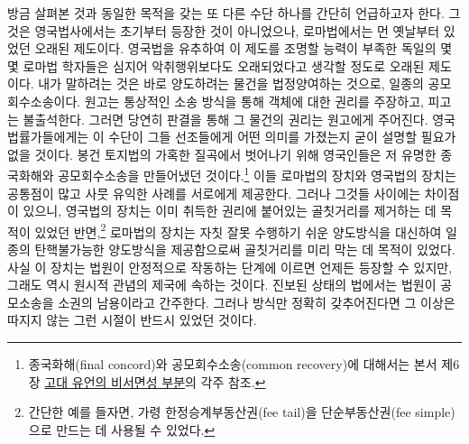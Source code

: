 방금 살펴본 것과 동일한 목적을 갖는 또 다른 수단 하나를
간단히 언급하고자 한다.
그것은 영국법사에서는 초기부터 등장한 것이 아니었으나,
로마법에서는 먼 옛날부터 있었던 오래된 제도이다.
영국법을 유추하여 이 제도를 조명할 능력이 부족한
독일의 몇몇 로마법 학자들은 심지어 악취행위보다도 오래되었다고
생각할 정도로 오래된 제도이다.
내가 말하려는 것은 바로
양도하려는 물건을
법정양여하는 것으로,
일종의 공모회수소송이다.
원고는 통상적인 소송 방식을 통해 객체에 대한 권리를 주장하고,
피고는 불출석한다. 그러면 당연히 판결을 통해 그 물건의 권리는
원고에게 주어진다.
영국 법률가들에게는
이 수단이 그들 선조들에게 어떤 의미를 가졌는지 굳이 설명할 필요가 없을 것이다.
봉건 토지법의 가혹한 질곡에서 벗어나기 위해
영국인들은
저 유명한
종국화해와 공모회수소송을 만들어냈던
것이다.\footnote{%
  종국화해(final concord)와 공모회수소송(common recovery)에 대해서는
  본서 제6장 \hyperlink{finerecovery}{고대 유언의 비서면성 부분}의 각주 참조.
  }
이들 로마법의 장치와 영국법의 장치는 공통점이 많고
사뭇 유익한 사례를 서로에게 제공한다.
그러나 그것들 사이에는 차이점이 있으니,
영국법의 장치는
이미 취득한 권리에 붙어있는 골칫거리를 제거하는 데 목적이 있었던
반면,\footnote{%
  간단한 예를 들자면,
  가령 한정승계부동산권(fee tail)을 단순부동산권(fee simple)으로
  만드는 데 사용될 수 있었다.
  }
로마법의 장치는
자칫 잘못 수행하기 쉬운 양도방식을 대신하여
일종의 탄핵불가능한 양도방식을 제공함으로써 골칫거리를 미리 막는 데
목적이 있었다.
사실 이 장치는 법원이 안정적으로 작동하는 단계에 이르면
언제든 등장할 수 있지만,
그래도 역시 원시적 관념의 제국에 속하는 것이다.
진보된 상태의 법에서는 법원이
공모소송을 소권의 남용이라고 간주한다.
그러나 방식만 정확히 갖추어진다면
그 이상은 따지지 않는 그런 시절이 반드시 있었던 것이다.

